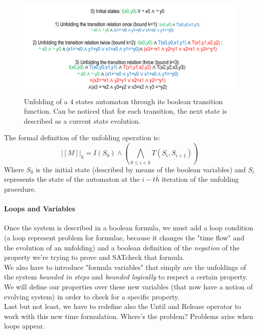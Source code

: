 \documentclass{article}
\begin{document}
						\begin{figure}[H]
							\centering
							\includegraphics[width = \textwidth]{./images/unfolding.png}
							\caption{Unfolding of a 4 states automaton through its boolean transition function. Can be noticed that for each transition, the next state is described as a current state evolution.}
						\end{figure}
						
						The formal definition of the unfolding operation is:
						\begin{equation}
							\vert [M] \vert_{k} = I(S_0) \wedge ( \bigwedge_{0 \leq i < k}T(S_{i}, S_{i + 1}) )
						\end{equation}
						Where $S_0$ is the initial state (described by means of the boolean variables) and $S_i$ represents the state of the automaton at the $i-th$ iteration of the unfolding procedure.
						
					\paragraph{Loops and Variables}
						Once the system is described in a boolean formula, we must add a loop condition (a loop represent problem for formulae, because it changes the "time flow" and the evolution of an unfolding) and a boolean definition of the \emph{negation} of the property we're trying to prove and SATcheck that formula.\\
						We also have to introduce "formula variables" that simply are the unfoldings of the system \emph{bounded in steps} and \emph{bounded logically} to respect a certain property. We will define our properties over these new variables (that now have a notion of evolving system) in order to check for a specific property.\\
						Last but not least, we have to redefine also the Until and Release operator to work with this new time formulation. Where's the problem? Problems arise when loops appear.
						
\end{document}
